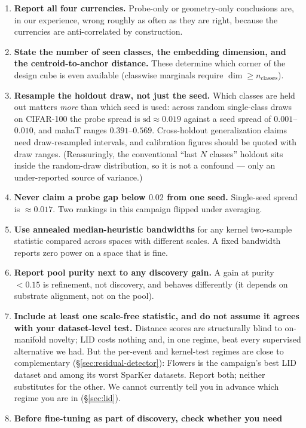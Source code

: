 \documentclass{article}
\newcommand{\lid}{\mathrm{LID}}
\begin{document}
\begin{enumerate}\itemsep2pt
\item \textbf{Report all four currencies.} Probe-only or geometry-only
conclusions are, in our experience, wrong roughly as often as they are right,
because the currencies are anti-correlated by construction.
\item \textbf{State the number of seen classes, the embedding dimension, and
the centroid-to-anchor distance.} These determine which corner of the design
cube is even available (classwise marginals require
$\dim \geq n_{\text{classes}}$).
\item \textbf{Resample the holdout draw, not just the seed.} Which classes are
held out matters \emph{more} than which seed is used: across random single-class
draws on CIFAR-100 the probe spread is $\mathrm{sd}\approx0.019$ against a seed
spread of $0.001$--$0.010$, and mahaT ranges $0.391$--$0.569$. Cross-holdout
generalization claims need draw-resampled intervals, and calibration figures
should be quoted with draw ranges. (Reassuringly, the conventional
``last $N$ classes'' holdout sits inside the random-draw distribution, so it is
not a confound --- only an under-reported source of variance.)
\item \textbf{Never claim a probe gap below $0.02$ from one seed.} Single-seed
spread is $\approx0.017$. Two rankings in this campaign flipped under
averaging.
\item \textbf{Use annealed median-heuristic bandwidths} for any kernel
two-sample statistic compared across spaces with different scales. A fixed
bandwidth reports zero power on a space that is fine.
\item \textbf{Report pool purity next to any discovery gain.} A gain at purity
$<0.15$ is refinement, not discovery, and behaves differently (it depends on
substrate alignment, not on the pool).
\item \textbf{Include at least one scale-free statistic, and do not assume it
agrees with your dataset-level test.} Distance scores are structurally blind to
on-manifold novelty; $\lid$ costs nothing and, in one regime, beat every
supervised alternative we had. But the per-event and kernel-test regimes are
close to complementary (\S\ref{sec:residual-detector}): Flowers is the
campaign's best LID dataset and among its worst SparKer datasets. Report both;
neither substitutes for the other. We cannot currently tell you in advance
which regime you are in (\S\ref{sec:lid}).
\item \textbf{Before fine-tuning as part of discovery, check whether you need
}
\end{enumerate}
\end{document}
